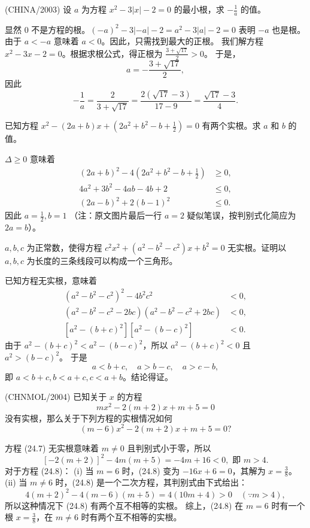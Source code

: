 \begin{questions}
\question (CHINA/2003) 设 $a$ 为方程 $x^2 - 3|x| - 2 = 0$ 的最小根，求 $-\frac{1}{a}$ 的值。

\begin{solution}
显然 0 不是方程的根。$(-a)^2 - 3|-a| - 2 = a^2 - 3|a| - 2 = 0$ 表明 $-a$ 也是根。
由于 $a < -a$ 意味着 $a < 0$。因此，只需找到最大的正根。
我们解方程 $x^2 - 3x - 2 = 0$。根据求根公式，得正根为 $\frac{3 + \sqrt{17}}{2} > 0$。
于是，
\[
a = -\frac{3 + \sqrt{17}}{2},
\]
因此
\[
-\frac{1}{a} = \frac{2}{3 + \sqrt{17}} = \frac{2(\sqrt{17} - 3)}{17 - 9} = \frac{\sqrt{17} - 3}{4}.
\]
\end{solution}

\question 已知方程 $x^2 - (2a + b)x + (2a^2 + b^2 - b + \frac{1}{2}) = 0$ 有两个实根。求 $a$ 和 $b$ 的值。

\begin{solution}
$\Delta \ge 0$ 意味着
\begin{align*}
(2a + b)^2 - 4(2a^2 + b^2 - b + \frac{1}{2}) &\ge 0, \\
4a^2 + 3b^2 - 4ab - 4b + 2 &\le 0, \\
(2a - b)^2 + 2(b - 1)^2 &\le 0.
\end{align*}
因此 $a = \frac{1}{2}, b = 1$ （注：原文图片最后一行 $a=2$ 疑似笔误，按判别式化简应为 $2a=b$）。
\end{solution}

\question $a, b, c$ 为正常数，使得方程 $c^2x^2 + (a^2 - b^2 - c^2)x + b^2 = 0$ 无实根。证明以 $a, b, c$ 为长度的三条线段可以构成一个三角形。

\begin{solution}
已知方程无实根，意味着
\begin{align*}
(a^2 - b^2 - c^2)^2 - 4b^2c^2 &< 0, \\
(a^2 - b^2 - c^2 - 2bc)(a^2 - b^2 - c^2 + 2bc) &< 0, \\
[a^2 - (b + c)^2][a^2 - (b - c)^2] &< 0.
\end{align*}
由于 $a^2 - (b + c)^2 < a^2 - (b - c)^2$，所以 $a^2 - (b + c)^2 < 0$ 且 $a^2 > (b - c)^2$。
于是
\[
a < b + c, \quad a > b - c, \quad a > c - b,
\]
即 $a < b + c, b < a + c, c < a + b$。结论得证。
\end{solution}

\question (CHNMOL/2004) 已知关于 $x$ 的方程
\[
mx^2 - 2(m + 2)x + m + 5 = 0 \tag{24.7}
\]
没有实根，那么关于下列方程的实根情况如何
\[
(m - 6)x^2 - 2(m + 2)x + m + 5 = 0? \tag{24.8}
\]

\begin{solution}
方程 (24.7) 无实根意味着 $m \neq 0$ 且判别式小于零，所以
\[
[-2(m + 2)]^2 - 4m(m + 5) = -4m + 16 < 0, \text{ 即 } m > 4.
\]
对于方程 (24.8)：
(i) 当 $m = 6$ 时，(24.8) 变为 $-16x + 6 = 0$，其解为 $x = \frac{3}{8}$。
(ii) 当 $m \neq 6$ 时，(24.8) 是一个二次方程，其判别式由下式给出：
\[
4(m + 2)^2 - 4(m - 6)(m + 5) = 4(10m + 4) > 0 \quad (\because m > 4),
\]
所以这种情况下 (24.8) 有两个互不相等的实根。
综上，(24.8) 在 $m = 6$ 时有一个根 $x = \frac{3}{8}$，在 $m \neq 6$ 时有两个互不相等的实根。
\end{solution}


\end{questions}

